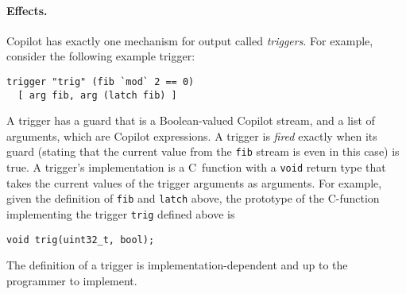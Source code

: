 \paragraph{Effects.}
Copilot has exactly one mechanism for output called \emph{triggers}.  For
example, consider the following example trigger:
%
\begin{lstlisting}[frame=single]
trigger "trig" (fib `mod` 2 == 0)
  [ arg fib, arg (latch fib) ]
\end{lstlisting}
A trigger has a guard that is a Boolean-valued Copilot stream, and a list of
arguments, which are Copilot expressions.  A trigger is \emph{fired} exactly
when its guard (stating that the current value from the {\tt fib} stream is
even in this case) is true.  A trigger's implementation is a C~function with a
{\tt void} return type that takes the current values of the trigger arguments as
arguments.  For example, given the definition of {\tt fib} and {\tt latch}
above, the prototype of the C-function implementing the trigger {\tt trig}
defined above is
%
\begin{lstlisting}[frame=single]
void trig(uint32_t, bool);
\end{lstlisting}
%
The definition of a trigger is implementation-dependent and up to
the programmer to implement.

